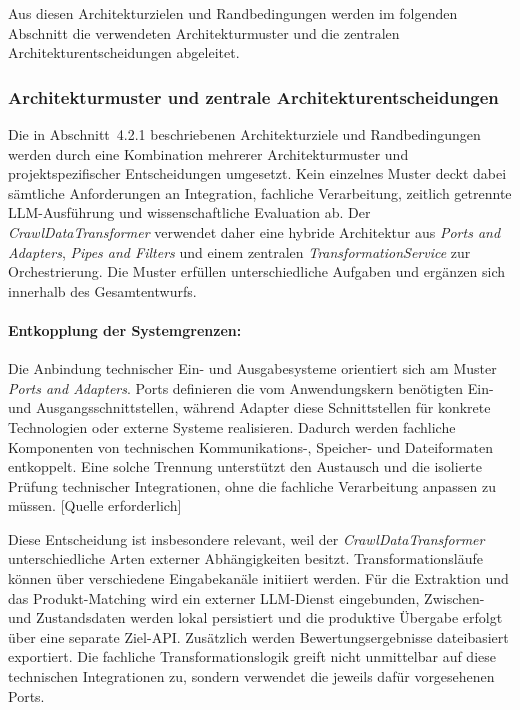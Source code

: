 Aus diesen Architekturzielen und Randbedingungen werden im folgenden Abschnitt die verwendeten Architekturmuster und die zentralen Architekturentscheidungen abgeleitet.


\subsubsection{Architekturmuster und zentrale Architekturentscheidungen}

Die in Abschnitt~4.2.1 beschriebenen Architekturziele und Randbedingungen werden durch eine Kombination mehrerer Architekturmuster und projektspezifischer Entscheidungen 
umgesetzt. Kein einzelnes Muster deckt dabei sämtliche Anforderungen an Integration, fachliche Verarbeitung, zeitlich getrennte LLM-Ausführung und wissenschaftliche Evaluation 
ab. Der \textit{CrawlDataTransformer} verwendet daher eine hybride Architektur aus \textit{Ports and Adapters}, \textit{Pipes and Filters} und einem zentralen 
\textit{TransformationService} zur Orchestrierung. Die Muster erfüllen unterschiedliche Aufgaben und ergänzen sich innerhalb des Gesamtentwurfs.

\paragraph{Entkopplung der Systemgrenzen:}

Die Anbindung technischer Ein- und Ausgabesysteme orientiert sich am Muster \textit{Ports and Adapters}. Ports definieren die vom Anwendungskern benötigten Ein- und 
Ausgangsschnittstellen, während Adapter diese Schnittstellen für konkrete Technologien oder externe Systeme realisieren. Dadurch werden fachliche Komponenten von technischen 
Kommunikations-, Speicher- und Dateiformaten entkoppelt. Eine solche Trennung unterstützt den Austausch und die isolierte Prüfung technischer Integrationen, ohne die fachliche
 Verarbeitung anpassen zu müssen. [Quelle erforderlich]

Diese Entscheidung ist insbesondere relevant, weil der \textit{CrawlDataTransformer} unterschiedliche Arten externer Abhängigkeiten besitzt. Transformationsläufe können über 
verschiedene Eingabekanäle initiiert werden. Für die Extraktion und das Produkt-Matching wird ein externer LLM-Dienst eingebunden, Zwischen- und Zustandsdaten werden lokal 
persistiert und die produktive Übergabe erfolgt über eine separate Ziel-API. Zusätzlich werden Bewertungsergebnisse dateibasiert exportiert. Die fachliche 
Transformationslogik greift nicht unmittelbar auf diese technischen Integrationen zu, sondern verwendet die jeweils dafür vorgesehenen Ports.

